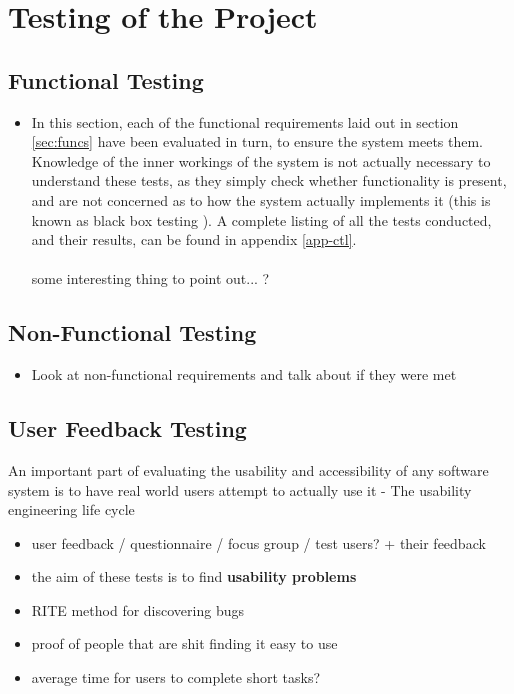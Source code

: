 \section{Testing of the Project}

\subsection{Functional Testing}
{\color{red}
	\begin{itemize}
		\item In this section, each of the functional requirements laid out in section \ref{sec:funcs} have been evaluated in turn, to ensure the system meets them. Knowledge of the inner workings of the system is not actually necessary to understand these tests, as they simply check whether functionality is present, and are not concerned as to how the system actually implements it (this is known as black box testing \cite{beizer1995black}). A complete listing of all the tests conducted, and their results, can be found in appendix \ref{app-ctl}.\ \\
		\ \\
		some interesting thing to point out... ?
	\end{itemize}
}

\subsection{Non-Functional Testing}
{\color{red}
	\begin{itemize}
		\item Look at non-functional requirements and talk about if they were met
	\end{itemize}
}

\subsection{User Feedback Testing}
An important part of evaluating the usability and accessibility of any software system is
to have real world users attempt to actually use it - The usability engineering life cycle \cite{nielsen1992usability}
{\color{red}
	\begin{itemize}
		\item user feedback / questionnaire / focus group / test users? + their feedback
		\item the aim of these tests is to find \textbf{usability problems}
		\item RITE method for discovering bugs
		\item proof of people that are shit finding it easy to use
		\item average time for users to complete short tasks?
	\end{itemize}
}
